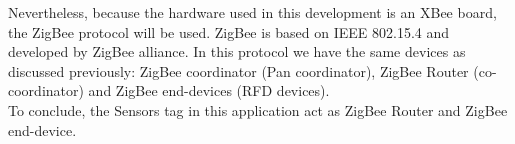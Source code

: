  Nevertheless, because the hardware used in this development is an XBee board, the ZigBee protocol will be used. ZigBee is based on IEEE 802.15.4 and developed by ZigBee alliance. In this protocol we have the same devices as discussed previously: ZigBee coordinator (Pan coordinator), ZigBee Router (co-coordinator) and ZigBee end-devices (RFD devices).\cite{zigbee}\\
 To conclude, the Sensors tag in this application act as ZigBee Router and ZigBee end-device.
\\
